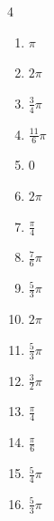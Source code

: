 \begin{multicols}{4}
\begin{enumerate}
  \item $\displaystyle \pi$

  \item $\displaystyle 2\pi$

  \item $\displaystyle \frac{3}{4}\pi$

  \item $\displaystyle \frac{11}{6}\pi$

  \item $\displaystyle 0$

\columnbreak %

  \item $\displaystyle 2\pi$

  \item $\displaystyle \frac{\pi}{4}$

  \item $\displaystyle \frac{7}{6}\pi$

  \item $\displaystyle \frac{5}{3}\pi$

  \item $\displaystyle 2\pi$

  \item $\displaystyle \frac{5}{3}\pi$

  \item $\displaystyle \frac{3}{2}\pi$

  \item $\displaystyle \frac{\pi}{4}$

  \item $\displaystyle \frac{\pi}{6}$

  \item $\displaystyle \frac{5}{4}\pi$

  \item $\displaystyle \frac{5}{3}\pi$


\end{enumerate}
\end{multicols}
